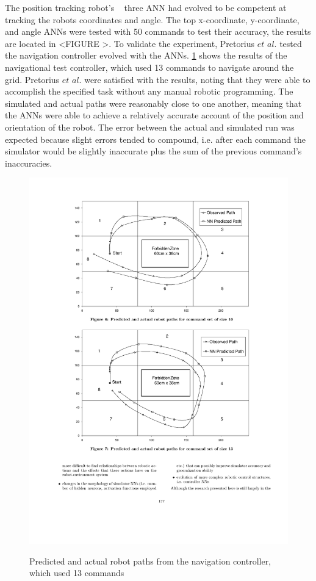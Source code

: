 \documentclass{sig-alternate}
\begin{document}
	The  position tracking robot's ~\cite{Pretorius:2009:TAN:1632149.1632171} three ANN had evolved to be competent at tracking the robots coordinates and angle. The top x-coordinate, y-coordinate, and angle ANNs were tested with 50 commands to test their accuracy, the results are located in <FIGURE >. To validate the experiment, Pretorius $et$ $al.$ tested the navigation controller evolved with the ANNs. \ref{fig:position tracking grid} shows the results of the navigational test controller, which used 13 commands to navigate around the grid. Pretorius $et$ $al.$ were satisfied with the results, noting that they were able to accomplish the specified task without any manual robotic programming. The simulated and actual paths were reasonably close to one another, meaning that the ANNs were able to achieve a relatively accurate account of the position and orientation of the robot. The error between the actual and simulated run was expected because slight errors tended to compound, i.e. after each command the simulator would be slightly inaccurate plus the sum of the previous command's inaccuracies. 
	
\begin{figure}%
\center
\caption{Predicted and actual robot paths from the navigation controller, which used 13 commands}

  \includegraphics[scale=1]{cr3}
\label{fig:position tracking grid}
\end{figure}
	  
\end{document}
